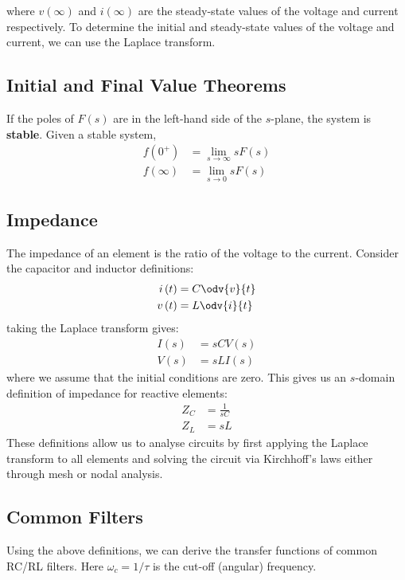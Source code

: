\documentclass{article}
\begin{document}
where \(v\left( \infty \right)\) and \(i\left( \infty \right)\) are the
steady-state values of the voltage and current respectively. To
determine the initial and steady-state values of the voltage and
current, we can use the Laplace transform.
\subsection{Initial and Final Value Theorems}
If the poles of \(F\left( s \right)\) are in the left-hand side of the
\(s\)-plane, the system is \textbf{stable}. Given a stable system,
\begin{align*}
    f\left( 0^{+} \right)  & = \lim_{s \to \infty} s F\left( s \right) \\
    f\left( \infty \right) & = \lim_{s \to 0} s F\left( s \right)
\end{align*}
\subsection{Impedance}
The impedance of an element is the ratio of the voltage to the current.
Consider the capacitor and inductor definitions:
\begin{align*}
    i\left( t \right) & = C \odv{v}{t} \\
    v\left( t \right) & = L \odv{i}{t}
\end{align*}
taking the Laplace transform gives:
\begin{align*}
    I\left( s \right) & = sC V\left( s \right) \\
    V\left( s \right) & = sL I\left( s \right)
\end{align*}
where we assume that the initial conditions are zero. This gives us an
\(s\)-domain definition of impedance for reactive elements:
\begin{align*}
    Z_C & = \frac{1}{sC} \\
    Z_L & = sL
\end{align*}
These definitions allow us to analyse circuits by first applying
the Laplace transform to all elements and solving the circuit via
Kirchhoff's laws either through mesh or nodal analysis.
\subsection{Common Filters}
Using the above definitions, we can derive the transfer functions of
common RC/RL filters. Here \(\omega_c = 1/\tau\) is the cut-off
(angular) frequency.
\end{document}
